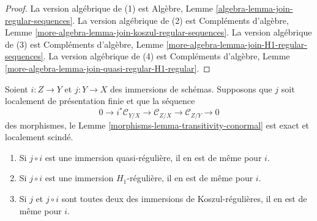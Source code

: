 \begin{proof}
La version algébrique de (1) est Algèbre, Lemme  \ref{algebra-lemma-join-regular-sequences}. La version
algébrique de (2) est Compléments d'algèbre, Lemme  \ref{more-algebra-lemma-join-koszul-regular-sequences}. La version algébrique
de (3) est Compléments d'algèbre, Lemme  \ref{more-algebra-lemma-join-H1-regular-sequences}. La version algébrique de (4) est
Compléments d'algèbre, Lemme  \ref{more-algebra-lemma-join-quasi-regular-H1-regular}.
\end{proof}

\begin{lemma}
\label{lemma-permanence-regular-immersion}
Soient  $i : Z \to Y$  et  $j : Y \to X$  des immersions de schémas. Supposons que
 $j$  soit localement de présentation finie et que la séquence
$$
0 \to i^*\mathcal{C}_{Y/X} \to
\mathcal{C}_{Z/X} \to
\mathcal{C}_{Z/Y} \to 0
$$
des morphismes, le Lemme  \ref{morphisms-lemma-transitivity-conormal}  est exact et localement scindé.
\begin{enumerate}
\item Si  $j \circ i$  est une immersion quasi-régulière, il en est de même pour
 $i$.
\item Si  $j \circ i$  est une immersion  $H_1$-régulière, il en est de même pour
 $i$.
\item Si  $j$  et  $j \circ i$  sont toutes deux des immersions de
Koszul-régulières, il en est de même pour  $i$.
\end{enumerate}
\end{lemma}

